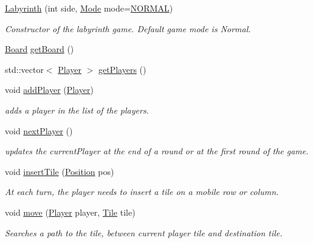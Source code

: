 \begin{DoxyCompactItemize}
\item 
\mbox{\hyperlink{classLabyrinth_a505ac0ac3ae87c1415ea30b6cf542bf5}{Labyrinth}} (int side, \mbox{\hyperlink{mode_8h_a46c8a310cf4c094f8c80e1cb8dc1f911}{Mode}} mode=\mbox{\hyperlink{mode_8h_a46c8a310cf4c094f8c80e1cb8dc1f911a50d1448013c6f17125caee18aa418af7}{N\+O\+R\+M\+AL}})
\begin{DoxyCompactList}\small\item\em Constructor of the labyrinth game. Default game mode is Normal. \end{DoxyCompactList}\item 
\mbox{\hyperlink{classBoard}{Board}} \mbox{\hyperlink{classLabyrinth_a8fcfe09eb620ff9b48f937ae6ff2c8aa}{get\+Board}} ()
\item 
std\+::vector$<$ \mbox{\hyperlink{classPlayer}{Player}} $>$ \mbox{\hyperlink{classLabyrinth_a69d0f4074fbaa91f8eb052b1b4ad8b97}{get\+Players}} ()
\item 
void \mbox{\hyperlink{classLabyrinth_ad1492b8efcf788402bdd161f6cfc03c6}{add\+Player}} (\mbox{\hyperlink{classPlayer}{Player}})
\begin{DoxyCompactList}\small\item\em adds a player in the list of the players. \end{DoxyCompactList}\item 
void \mbox{\hyperlink{classLabyrinth_adb4f7dc7978f69919812a5dcd735da21}{next\+Player}} ()
\begin{DoxyCompactList}\small\item\em updates the current\+Player at the end of a round or at the first round of the game. \end{DoxyCompactList}\item 
void \mbox{\hyperlink{classLabyrinth_af81c73f5853fee97d015889d30475ffe}{insert\+Tile}} (\mbox{\hyperlink{structPosition}{Position}} pos)
\begin{DoxyCompactList}\small\item\em At each turn, the player needs to insert a tile on a mobile row or column. \end{DoxyCompactList}\item 
void \mbox{\hyperlink{classLabyrinth_ae2d8d7eb36191331670ed5dada124995}{move}} (\mbox{\hyperlink{classPlayer}{Player}} player, \mbox{\hyperlink{classTile}{Tile}} tile)
\begin{DoxyCompactList}\small\item\em Searches a path to the tile, between current player tile and destination tile. \end{DoxyCompactList}\item 

\end{DoxyCompactItemize}
